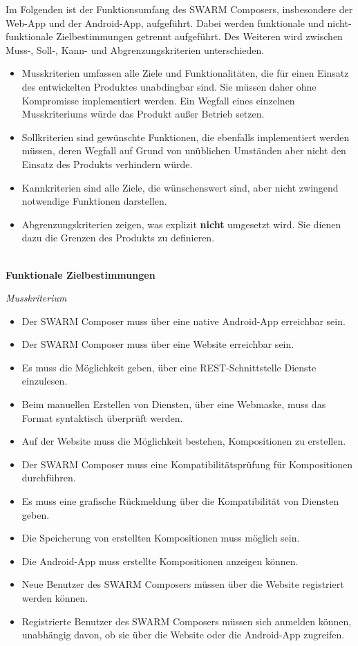 Im Folgenden ist der Funktionsumfang des SWARM Composers, insbesondere der Web-App und der Android-App, aufgeführt. Dabei werden funktionale und nicht-funktionale Zielbestimmungen getrennt aufgeführt. Des Weiteren wird zwischen Muss-, Soll-, Kann- und Abgrenzungskriterien unterschieden.
%
\begin{itemize}[leftmargin=4pc]
	\item Musskriterien umfassen alle Ziele und Funktionalitäten, die für einen Einsatz des entwickelten Produktes unabdingbar sind.
	Sie müssen daher ohne Kompromisse implementiert werden. Ein Wegfall eines einzelnen Musskriteriums würde das Produkt außer Betrieb setzen.
	\item Sollkriterien sind gewünschte Funktionen, die ebenfalls implementiert werden müssen, deren Wegfall auf Grund von unüblichen Umständen aber nicht den Einsatz des Produkts verhindern würde.
	\item Kannkriterien sind alle Ziele, die wünschenswert sind, aber nicht zwingend notwendige Funktionen darstellen. 
	\item Abgrenzungskriterien zeigen, was explizit \textbf{nicht} umgesetzt wird. Sie dienen dazu die Grenzen des Produkts zu definieren.
	\\\\
\end{itemize}
%

\textbf{Funktionale Zielbestimmungen}\newline
%

\textit{Musskriterium}

\begin{itemize}[leftmargin=4pc]
	\item Der SWARM Composer muss über eine native Android-App erreichbar sein.
	\item Der SWARM Composer muss über eine Website erreichbar sein.
	\item Es muss die Möglichkeit geben, über eine REST-Schnittstelle Dienste einzulesen.
	\item Beim manuellen Erstellen von Diensten, über eine Webmaske, muss das Format syntaktisch überprüft werden.
	\item Auf der Website muss die Möglichkeit bestehen, Kompositionen zu erstellen.
	\item Der SWARM Composer muss eine Kompatibilitätsprüfung für Kompositionen durchführen.
	\item Es muss eine grafische Rückmeldung über die Kompatibilität von Diensten geben.
	\item Die Speicherung von erstellten Kompositionen muss möglich sein.
	\item Die Android-App muss erstellte Kompositionen anzeigen können.
	\item Neue Benutzer des SWARM Composers müssen über die Website registriert werden können.
	\item Registrierte Benutzer des SWARM Composers müssen sich anmelden können, unabhängig davon, ob sie über die Website oder die Android-App zugreifen.
\end{itemize}

